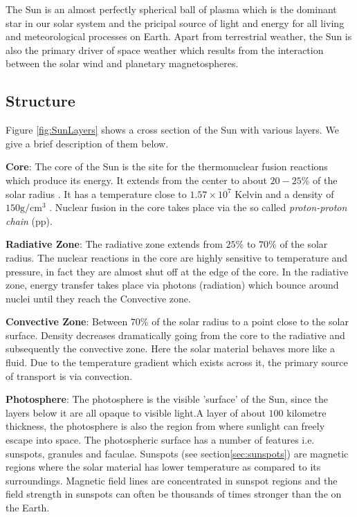 The Sun is an almost perfectly spherical ball of plasma which is the dominant star in our solar system and 
the pricipal source of light and energy for all living and meteorological processes on Earth. Apart from 
terrestrial weather, the Sun is also the primary driver of space weather which results from the interaction 
between the solar wind and planetary magnetospheres.

\subsection{Structure}

Figure \ref{fig:SunLayers} shows a cross section of the Sun with various layers. We give a brief description 
of them below.

\textbf{Core}: The core of the Sun is the site for the thermonuclear fusion reactions which produce its energy. 
It extends from the center to about $20-25\%$ of the solar radius \citep{SolarAct}. It has a temperature close to 
$1.57 \times 10^7$ Kelvin and a density of $150 \text{g}/\text{cm}^3$ \citep{SolarCore}. Nuclear fusion in the core 
takes place via the so called \emph{proton-proton chain} (pp).

\textbf{Radiative Zone}: The radiative zone extends from $25\%$ to $70\%$ of the solar radius. The nuclear reactions 
in the core are highly sensitive to temperature and pressure, in fact they are almost shut off at the edge of the core. 
In the radiative zone, energy transfer takes place via photons (radiation) which bounce around nuclei until 
they reach the Convective zone.

\textbf{Convective Zone}: Between $70\%$ of the solar radius to a point close to the solar surface. Density decreases 
dramatically going from the core to the radiative and subsequently the convective zone. Here the solar material behaves more 
like a fluid. Due to the temperature gradient which exists across it, the primary source of transport is 
via convection.

\textbf{Photosphere}: The photosphere is the visible 'surface' of the Sun, since the layers below it are all opaque to 
visible light.A layer of about $100$ kilometre thickness, the photosphere is also the region from where sunlight can freely 
escape into space. The photospheric surface has a number of features i.e. sunspots, granules and faculae. 
Sunspots (see section\ref{sec:sunspots}) are magnetic regions where the solar material has lower temperature as compared 
to its surroundings. Magnetic field lines are concentrated in sunspot regions and the field strength in sunspots can often 
be thousands of times stronger than the on the Earth.

